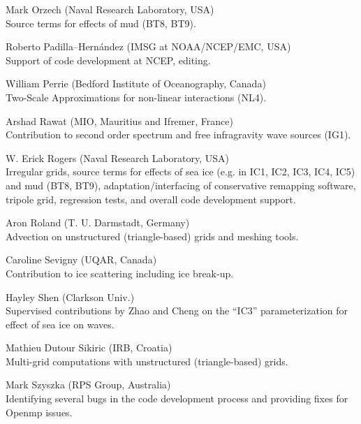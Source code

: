 \begin{list}{\ldots}{ }
\item [Mark Orzech]  (Naval Research Laboratory, USA)\\ 
  Source terms for effects of mud (BT8, BT9).

\item [Roberto Padilla--Hern\'andez]  (IMSG at NOAA/NCEP/EMC, USA)\\ 
  Support of code development at NCEP, editing.

\item [William Perrie] (Bedford Institute of Oceanography, Canada)\\
 Two-Scale Approximations for non-linear interactions (NL4).

\item [Arshad Rawat] (MIO, Mauritius and Ifremer, France) \\
  Contribution to second order spectrum and free infragravity wave sources (IG1).    
   
\item [W. Erick Rogers]  (Naval Research Laboratory, USA)\\ 
  Irregular grids, source terms for effects of sea ice (e.g. in IC1, IC2, IC3, IC4, IC5) and mud (BT8, BT9), adaptation/interfacing of conservative remapping software, tripole grid, regression tests, and overall code development support.

\item [Aron Roland] (T. U. Darmstadt, Germany) \\
  Advection on unstructured (triangle-based) grids and meshing tools.

\item [Caroline Sevigny] (UQAR, Canada) \\
  Contribution to ice scattering including ice break-up.

\item [Hayley Shen] (Clarkson Univ.) \\
  Supervised contributions by Zhao and Cheng on the ``IC3'' parameterization for effect of sea ice on waves.

\item [Mathieu Dutour Sikiric] (IRB, Croatia) \\
  Multi-grid computations with unstructured (triangle-based) grids.

\item [Mark Szyszka] (RPS Group, Australia) \\
  Identifying several bugs in the code development process and providing fixes for Openmp issues.


\end{list}
